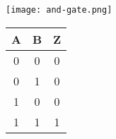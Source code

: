 \begin{minipage}{\textwidth}
\vspace{1cm}
\begin{minipage}[c]{0.49\textwidth}
    \centering
    \texttt{[image: and-gate.png]}
\end{minipage}
\hfill
\begin{minipage}[c]{.49\textwidth}
    \centering
    \begin{tabular}{ |c|c|c| } \hline 
        \textbf{A} & \textbf{B} & \textbf{Z} \\ \hline
        0 & 0 & 0 \\
        0 & 1 & 0 \\
        1 & 0 & 0 \\
        1 & 1 & 1 \\ 
        \hline
    \end{tabular}
\end{minipage}
\end{minipage}

